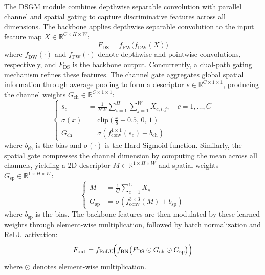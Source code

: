 \documentclass{nsr}
\begin{document}
The DSGM module combines depthwise separable convolution with parallel channel and spatial gating to capture discriminative features across all dimensions. The backbone applies depthwise separable convolution to the input feature map $X \in \mathbb{R}^{C\times H\times W}$:
\begin{equation}
F_{\mathrm{DS}} = f_{\mathrm{PW}}\!\bigl(f_{\mathrm{DW}}(X)\bigr)
\label{eq:dsgm_backbone}
\end{equation}
where $f_{\mathrm{DW}}(\cdot)$ and $f_{\mathrm{PW}}(\cdot)$ denote depthwise and pointwise convolutions, respectively, and $F_{\mathrm{DS}}$ is the backbone output. Concurrently, a dual-path gating mechanism refines these features. The channel gate aggregates global spatial information through average pooling to form a descriptor $s \in \mathbb{R}^{C \times 1 \times 1}$, producing the channel weights $G_{\mathrm{ch}} \in \mathbb{R}^{C \times 1 \times 1}$:
\begin{equation}
\left\{
\begin{aligned}
s_c &= \frac{1}{HW}\sum_{i=1}^{H}\sum_{j=1}^{W}X_{c,i,j},\quad c=1,\dots,C\\[0.5mm]
\sigma(x) &= \mathrm{clip}\!\left(\frac{x}{8}+0.5,\,0,\,1\right)\\[0.5mm]
G_{\mathrm{ch}} &= \sigma\!\left(f_{\mathrm{conv}}^{1\times1}(s_c)+b_{\mathrm{ch}}\right)
\end{aligned}
\right.
\label{eq:dsgm_ch_gate}
\end{equation}
where $b_{\mathrm{ch}}$ is the bias and $\sigma(\cdot)$ is the Hard-Sigmoid function. Similarly, the spatial gate compresses the channel dimension by computing the mean across all channels, yielding a 2D descriptor $M \in \mathbb{R}^{1 \times H \times W}$ and spatial weights $G_{\mathrm{sp}} \in \mathbb{R}^{1 \times H \times W}$:
\begin{equation}
\left\{
\begin{aligned}
M &= \frac{1}{C}\sum_{c=1}^{C}X_c\\[0.5mm]
G_{\mathrm{sp}} &= \sigma\!\left(f_{\mathrm{conv}}^{3\times3}(M)+b_{\mathrm{sp}}\right)
\end{aligned}
\right.
\label{eq:dsgm_sp_gate}
\end{equation}
where $b_{\mathrm{sp}}$ is the bias. The backbone features are then modulated by these learned weights through element-wise multiplication, followed by batch normalization and ReLU activation:
\begin{equation}
F_{\mathrm{out}} = f_{\mathrm{ReLU}}\!\Bigl(f_{\mathrm{BN}}\bigl(F_{\mathrm{DS}}\odot G_{\mathrm{ch}}\odot G_{\mathrm{sp}}\bigr)\Bigr)
\label{eq:dsgm_out}
\end{equation}
where $\odot$ denotes element-wise multiplication.
\end{document}
